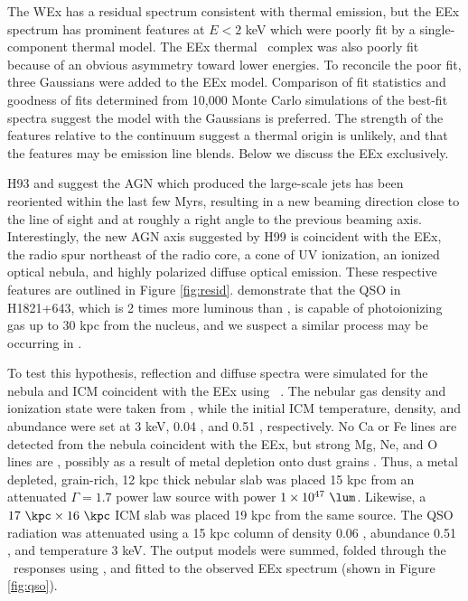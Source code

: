 \documentclass[useAMS,usenatbib]{mn2e}
\begin{document}
The WEx has a residual spectrum consistent with thermal emission, but
the EEx spectrum has prominent features at $E < 2$ keV which were
poorly fit by a single-component thermal model. The EEx thermal
\feka\ complex was also poorly fit because of an obvious asymmetry
toward lower energies. To reconcile the poor fit, three Gaussians were
added to the EEx model. Comparison of fit statistics and goodness of
fits determined from 10,000 Monte Carlo simulations of the best-fit
spectra suggest the model with the Gaussians is preferred. The
strength of the features relative to the continuum suggest a thermal
origin is unlikely, and that the features may be emission line
blends. Below we discuss the EEx exclusively.

H93 and \citet[][hereafter H99]{1999ApJ...512..145H} suggest the AGN
which produced the large-scale jets has been reoriented within the
last few Myrs, resulting in a new beaming direction close to the line
of sight and at roughly a right angle to the previous beaming
axis. Interestingly, the new AGN axis suggested by H99 is coincident
with the EEx, the radio spur northeast of the radio core, a cone of UV
ionization, an ionized optical nebula, and highly polarized diffuse
optical emission. These respective features are outlined in Figure
\ref{fig:resid}. \citet{2010MNRAS.402.1561R} demonstrate that the QSO
in H1821+643, which is 2 times more luminous than \irs, is capable of
photoionizing gas up to 30 kpc from the nucleus, and we suspect a
similar process may be occurring in \irs.

To test this hypothesis, reflection and diffuse spectra were simulated
for the nebula and ICM coincident with the EEx using
\cloudy\ \citep{cloudy}. The nebular gas density and ionization state
were taken from \citet{2000AJ....120..562T}, while the initial ICM
temperature, density, and abundance were set at 3 keV, 0.04 \pcc, and
0.51 \Zsol, respectively. No Ca or Fe lines are detected from the
nebula coincident with the EEx, but strong Mg, Ne, and O lines are
\citep{2000AJ....120..562T}, possibly as a result of metal depletion
onto dust grains \citep[\eg][]{1993ApJ...414L..17D}. Thus, a metal
depleted, grain-rich, 12 kpc thick nebular slab was placed 15 kpc from
an attenuated $\Gamma = 1.7$ power law source with power $1 \times
10^{47} ~\lum$. Likewise, a $17 ~\kpc \times 16 ~\kpc$ ICM slab was
placed 19 kpc from the same source. The QSO radiation was attenuated
using a 15 kpc column of density 0.06 \pcc, abundance 0.51 \Zsol, and
temperature 3 keV. The output models were summed, folded through the
\chandra\ responses using \xspec, and fitted to the observed EEx
spectrum (shown in Figure \ref{fig:qso}).
\end{document}
